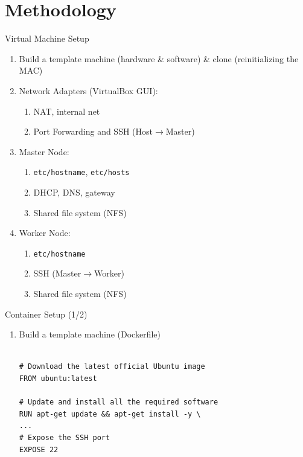 \documentclass[10pt]{beamer}
\begin{document}
\section{Methodology}
\begin{frame}{Virtual Machine Setup}
  \begin{enumerate}
    \item Build a template machine (hardware \& software) \& clone (reinitializing the MAC)
    \item Network Adapters (VirtualBox GUI):
    \begin{enumerate}
      \item NAT, internal net
      \item Port Forwarding and SSH (Host$\rightarrow$Master) 
    \end{enumerate}
    \item Master Node: 
    \begin{enumerate}
      \item \texttt{etc/hostname}, \texttt{etc/hosts}
      \item DHCP, DNS, gateway
      \item Shared file system (NFS)
    \end{enumerate}
    \item Worker Node: 
    \begin{enumerate}
      \item \texttt{etc/hostname}
      \item SSH (Master$\rightarrow$Worker)
      \item Shared file system (NFS)
    \end{enumerate}
  \end{enumerate}
  
\end{frame}


\begin{frame}[fragile]{Container Setup (1/2)}
\begin{enumerate}
\item Build a template machine (\alert{Dockerfile})
{\small\begin{verbatim}

# Download the latest official Ubuntu image
FROM ubuntu:latest

# Update and install all the required software
RUN apt-get update && apt-get install -y \ 
...
# Expose the SSH port
EXPOSE 22
\end{verbatim}}

\end{enumerate}
  
\end{frame}
\end{document}
